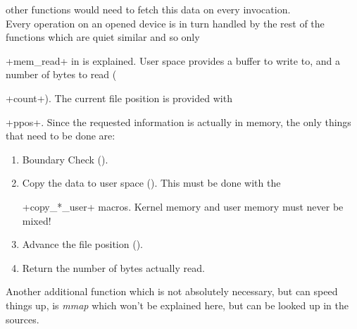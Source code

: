 \documentclass[12pt,a4paper,parskip=full,abstract=true,BCOR=12mm,twoside,open=right]{scrreprt}
\newcommand*{\SavedLstInline}{}
\DeclareRobustCommand*{\lstinline}{%
  \ifmmode
    \let\SavedBGroup\bgroup
    \def\bgroup{%
      \let\bgroup\SavedBGroup
      \hbox\bgroup
    }%
  \fi
  \SavedLstInline
}
\begin{document}
other functions would need to fetch this data on every invocation.\\
Every operation on an opened device is in turn handled by the rest of the
functions which are quiet similar and so only \lstinline+mem_read+ in
 is explained. User space provides a buffer to write to,
and a number of bytes to read (\lstinline+count+). The current file
position is provided with \lstinline+ppos+. Since the requested information
is actually in memory, the only things that need to be done are:
\begin{enumerate}
    \item Boundary Check ().
    \item Copy the data to user space (). This must be
        done with the \lstinline+copy_*_user+ macros. Kernel memory and
        user memory must never be mixed!
    \item Advance the file position ().
    \item Return the number of bytes actually read.
\end{enumerate}
Another additional function which is not absolutely necessary, but can speed
things up, is \emph{mmap} which won't be explained here, but can be looked up
in the sources.
\end{document}
